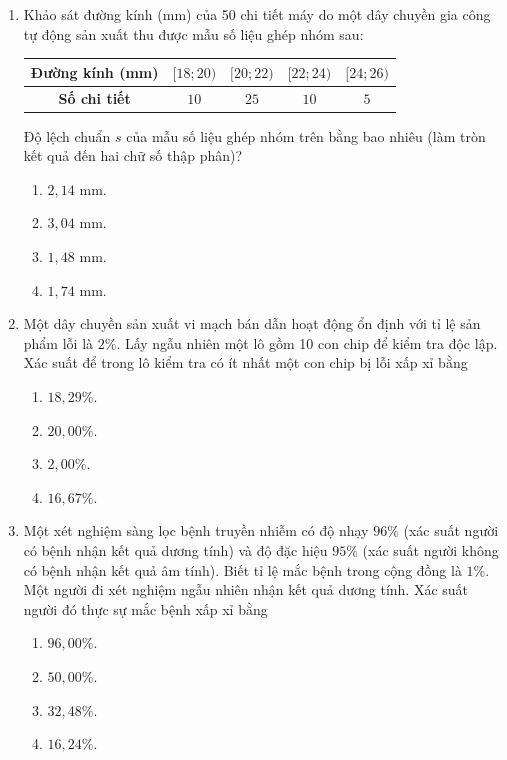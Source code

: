 \documentclass[12pt,a4paper]{article}
\begin{document}
\begin{enumerate}[label=\textbf{Câu \arabic*:}, leftmargin=*]
\item
\begin{minipage}[t]{\linewidth} 
Khảo sát đường kính (mm) của 50 chi tiết máy do một dây chuyền gia công tự động sản xuất thu được mẫu số liệu ghép nhóm sau:
\begin{center}
\begin{tabular}{|c|c|c|c|c|}
\hline
\textbf{Đường kính (mm)} & $[18; 20)$ & $[20; 22)$ & $[22; 24)$ & $[24; 26)$ \\ \hline
\textbf{Số chi tiết} & $10$ & $25$ & $10$ & $5$ \\ \hline
\end{tabular}
\end{center}
Độ lệch chuẩn $s$ của mẫu số liệu ghép nhóm trên bằng bao nhiêu (làm tròn kết quả đến hai chữ số thập phân)?
\begin{enumerate}[label=\Alph*., itemsep=0pt, topsep=3pt, parsep=0pt]
    \item $2{,}14\text{ mm}$.
    \item $3{,}04\text{ mm}$.
    \item $1{,}48\text{ mm}$.
    \item $1{,}74\text{ mm}$.
\end{enumerate}
\end{minipage}

\item
\begin{minipage}[t]{\linewidth} 
Một dây chuyền sản xuất vi mạch bán dẫn hoạt động ổn định với tỉ lệ sản phẩm lỗi là $2\%$. Lấy ngẫu nhiên một lô gồm 10 con chip để kiểm tra độc lập. Xác suất để trong lô kiểm tra có ít nhất một con chip bị lỗi xấp xỉ bằng
\begin{enumerate}[label=\Alph*., itemsep=0pt, topsep=3pt, parsep=0pt]
    \item $18{,}29\%$.
    \item $20{,}00\%$.
    \item $2{,}00\%$.
    \item $16{,}67\%$.
\end{enumerate}
\end{minipage}

\item
\begin{minipage}[t]{\linewidth} 
Một xét nghiệm sàng lọc bệnh truyền nhiễm có độ nhạy $96\%$ (xác suất người có bệnh nhận kết quả dương tính) và độ đặc hiệu $95\%$ (xác suất người không có bệnh nhận kết quả âm tính). Biết tỉ lệ mắc bệnh trong cộng đồng là $1\%$. Một người đi xét nghiệm ngẫu nhiên nhận kết quả dương tính. Xác suất người đó thực sự mắc bệnh xấp xỉ bằng
\begin{enumerate}[label=\Alph*., itemsep=0pt, topsep=3pt, parsep=0pt]
    \item $96{,}00\%$.
    \item $50{,}00\%$.
    \item $32{,}48\%$.
    \item $16{,}24\%$.
\end{enumerate}
\end{minipage}


\end{enumerate}
\end{document}
